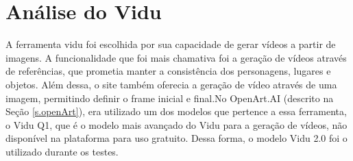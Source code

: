 \FloatBarrier
\section{Análise do Vidu}
\label{s.vidu}

A ferramenta vidu foi escolhida por sua capacidade de gerar vídeos a partir de imagens. A funcionalidade que foi mais chamativa foi a geração de vídeos através de referências, que prometia manter a consistência dos personagens, lugares e objetos. Além dessa, o site também oferecia a geração de vídeo através de uma imagem, permitindo definir o frame inicial e final.No OpenArt.AI (descrito na Seção \ref{s.openArt}), era utilizado um dos modelos que pertence a essa ferramenta, o Vidu Q1, que é o modelo mais avançado do Vidu para a geração de vídeos, não disponível na plataforma para uso gratuito. Dessa forma, o modelo Vidu 2.0 foi o utilizado durante os testes.

